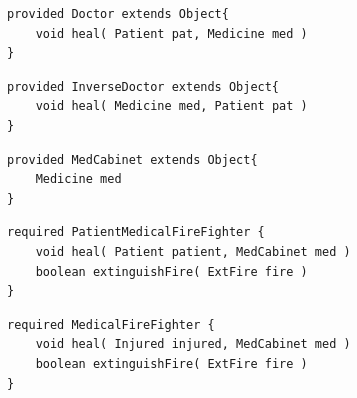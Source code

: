 \documentclass[a4paper,12pt]{article}
\begin{document}
\begin{lstlisting}[style = dsl]
provided Doctor extends Object{	
	void heal( Patient pat, Medicine med )
}
\end{lstlisting}


\begin{lstlisting}[style = dsl]
provided InverseDoctor extends Object{	
	void heal( Medicine med, Patient pat )
}
\end{lstlisting}

\begin{lstlisting}[style = dsl]
provided MedCabinet extends Object{
	Medicine med
}
\end{lstlisting}

\begin{lstlisting}[style = dsl]
required PatientMedicalFireFighter {
	void heal( Patient patient, MedCabinet med )
	boolean extinguishFire( ExtFire fire )	
}
\end{lstlisting}

\begin{lstlisting}[caption={Bibliothek \emph{ExampLe} von Typen},captionpos=b, style = dsl]
required MedicalFireFighter {
	void heal( Injured injured, MedCabinet med )
	boolean extinguishFire( ExtFire fire )	
}
\end{lstlisting}\label{lst:libEx}

\newpage
\end{document}

